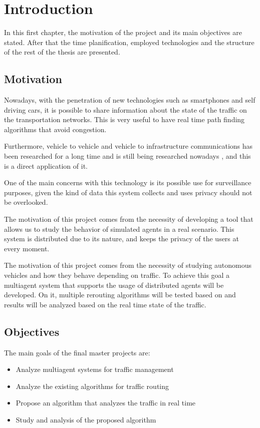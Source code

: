 \chapter{Introduction}

In this first chapter, the motivation of the project and its main objectives are stated. After that the time planification, employed technologies and the structure of the rest of the thesis are presented.

\section{Motivation}

Nowadays, with the penetration of new technologies such as smartphones and self driving cars, it is possible to share information about the state of the traffic on the transportation networks. This is very useful to have real time path finding algorithms that avoid congestion.

Furthermore, vehicle to vehicle and vehicle to infrastructure communications has been researched for a long time\cite{yang_liu_zhao_vaidya} and is still being researched nowadays \cite{tuohy_glavin_hughes_jones_trivedi_kilmartin_2015}, and this is a direct application of it.

One of the main concerns with this technology is its possible use for surveillance purposes, given the kind of data this system collects and uses privacy should not be overlooked.

The motivation of this project comes from the necessity of developing a tool that allows us to study the behavior of simulated agents in a real scenario. This system is distributed due to its nature, and keeps the privacy of the users at every moment.

The motivation of this project comes from the necessity of studying autonomous vehicles and how they behave depending on traffic. To achieve this goal a multiagent system that supports the usage of distributed agents will be developed. On it, multiple rerouting algorithms will be tested based on 
\cite{nisan_2007} and results will be analyzed based on the real time state of the traffic.

\section{Objectives}

The main goals of the final master projects are:

\begin{itemize}
\item Analyze multiagent systems for traffic management
\item Analyze the existing algorithms for traffic routing
\item Propose an algorithm that analyzes the traffic in real time
\item Study and analysis of the proposed algorithm
\end{itemize}

